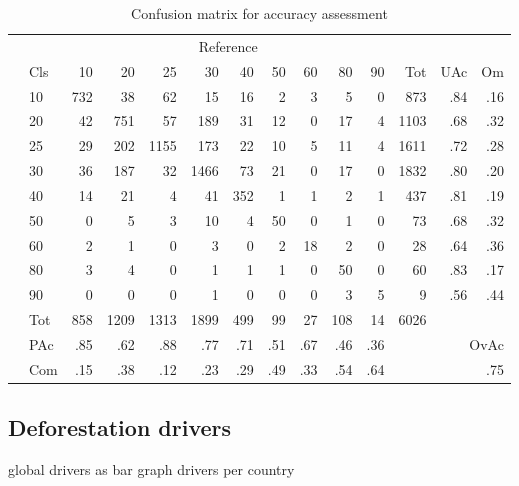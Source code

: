 	\begin{table}[ht]
		\centering
		\caption[Accuracy assessment]{Confusion matrix for accuracy assessment}
		\label{tab:accuracy}
		\begin{tabular}{ll|rrrrrrrrr|rrr}
			& & \multicolumn{9}{c|}{Reference} & & & \\
			& Cls & 10 & 20 & 25 & 30 & 40 & 50 & 60 & 80 & 90 & Tot & UAc & Om \\\hline
			\multirow{9}{*}{\STAB{\rotatebox[origin=c]{90}{Prediction}}}
			& 10 & 732 & 38 & 62 & 15 & 16 & 2 & 3 & 5 & 0 & 873 & .84 & .16 \\ 
			& 20 & 42 & 751 & 57 & 189 & 31 & 12 & 0 & 17 & 4 & 1103 & .68 & .32 \\ 
			& 25 & 29 & 202 & 1155 & 173 & 22 & 10 & 5 & 11 & 4 & 1611 & .72 & .28 \\ 
			& 30 & 36 & 187 & 32 & 1466 & 73 & 21 & 0 & 17 & 0 & 1832 & .80 & .20 \\ 
			& 40 & 14 & 21 & 4 & 41 & 352 & 1 & 1 & 2 & 1 & 437 & .81 & .19 \\ 
			& 50 & 0 & 5 & 3 & 10 & 4 & 50 & 0 & 1 & 0 & 73 & .68 & .32 \\ 
			& 60 & 2 & 1 & 0 & 3 & 0 & 2 & 18 & 2 & 0 & 28 & .64 & .36 \\ 
			& 80 & 3 & 4 & 0 & 1 & 1 & 1 & 0 & 50 & 0 & 60 & .83 & .17 \\ 
			& 90 & 0 & 0 & 0 & 1 & 0 & 0 & 0 & 3 & 5 & 9 & .56 & .44 \\\hline 
			& Tot & 858 & 1209 & 1313 & 1899 & 499 & 99 & 27 & 108 & 14 & 6026 & & \\
			& PAc & .85 & .62 & .88 & .77 & .71 & .51 & .67 & .46 & .36 & & \multicolumn{2}{r}{OvAc} \\
			& Com & .15 & .38 & .12 & .23 & .29 & .49 & .33 & .54 & .64 & &
			\multicolumn{2}{r}{.75} \\ 
		\end{tabular}
	\end{table}

\newpage
\subsection{Deforestation drivers}
		{\color{red} global drivers as bar graph}
		{\color{red} drivers per country}

